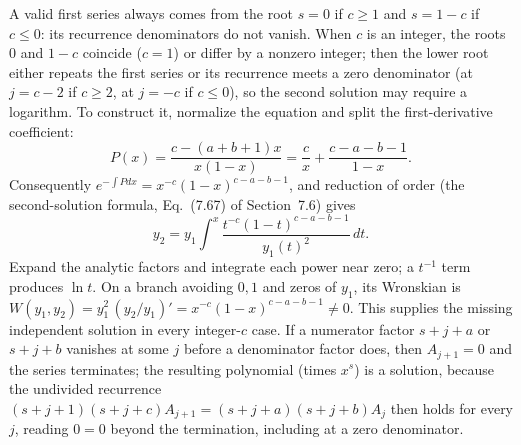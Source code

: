  A valid first series always comes from the root
$s=0$ if $c\ge1$ and $s=1-c$ if $c\le0$: its recurrence denominators
do not vanish. When $c$ is an integer, the roots $0$ and $1-c$ coincide
($c=1$) or differ by a nonzero integer; then the lower root either
repeats the first series or its recurrence meets a zero denominator (at
$j=c-2$ if $c\ge2$, at $j=-c$ if $c\le0$), so the second solution may
require a logarithm. To construct it,
normalize the equation and split the first-derivative coefficient:
\[
P(x)=\frac{c-(a+b+1)x}{x(1-x)}
=\frac cx+\frac{c-a-b-1}{1-x}.
\]
Consequently $e^{-\int Pdx}=x^{-c}(1-x)^{c-a-b-1}$, and reduction of
order (the second-solution formula, Eq.~(7.67) of Section~7.6) gives
\[
y_2=y_1\int^x\frac{t^{-c}(1-t)^{c-a-b-1}}{y_1(t)^2}\,dt.
\]
Expand the analytic factors and integrate each power near zero; a
$t^{-1}$ term produces $\ln t$. On a branch avoiding $0,1$ and zeros
of $y_1$, its Wronskian is
$W(y_1,y_2)=y_1^2\,(y_2/y_1)'=x^{-c}(1-x)^{c-a-b-1}\ne0$.
This supplies the missing independent solution in every integer-$c$
case. If a numerator factor $s+j+a$ or $s+j+b$ vanishes at some $j$
before a denominator factor does, then $A_{j+1}=0$ and the series
terminates; the resulting polynomial (times $x^s$) is a solution,
because the undivided recurrence
$(s+j+1)(s+j+c)A_{j+1}=(s+j+a)(s+j+b)A_j$ then holds for every $j$,
reading $0=0$ beyond the termination, including at a zero denominator.

